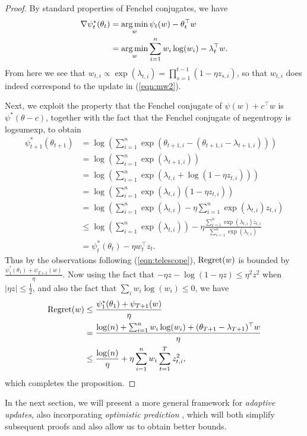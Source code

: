\documentclass[paper_icml.tex]{subfiles}
\begin{document}
\begin{proof}
By standard properties of Fenchel conjugates, we have
\begin{align}
\nabla \psi_t^*(\theta_t) &= \argmin_w \psi_t(w) - \theta_t^{\top}w \\
 &= \argmin_w \sum_{i=1}^n w_i\log(w_i) - \lambda_t^{\top}w.
\end{align}
From here we see that 
$w_{t,i} \propto \exp(\lambda_{t,i}) = \prod_{s=1}^{t-1} (1-\eta z_{s,i})$, 
so that $w_{t,i}$ does indeed correspond to the update in (\ref{eqn:mw2}). 

Next, we exploit the property that the Fenchel conjugate of $\psi(w) + c^{\top}w$ 
is $\psi^*(\theta - c)$, together with the fact that the Fenchel conjugate of 
negentropy is logsumexp, to obtain
\begin{align}
\psi_{t+1}^*(\theta_{t+1}) &= \log\left(\sum_{i=1}^n \exp(\theta_{t+1,i} - (\theta_{t+1,i}-\lambda_{t+1,i}))\right) \\
 &= \log\left(\sum_{i=1}^n \exp(\lambda_{t+1,i})\right) \\
 &= \log\left(\sum_{i=1}^n \exp(\lambda_{t,i} + \log(1 - \eta z_{t,i}))\right) \\
 &= \log\left(\sum_{i=1}^n \exp(\lambda_{t,i})(1 - \eta z_{t,i})\right) \\
 &= \log\left(\sum_{i=1}^n \exp(\lambda_{t,i}) - \eta \sum_{i=1}^n \exp(\lambda_{t,i})z_{t,i}\right) \\
 &\leq \log\left(\sum_{i=1}^n \exp(\lambda_{t,i})\right) - \eta \frac{\sum_{i=1}^n \exp(\lambda_{t,i})z_{t,i}}{\sum_{i=1}^n \exp(\lambda_{t,i})} \\
 &= \psi_t^*(\theta_t) - \eta w_t^{\top}z_t.
\end{align}
Thus by the observations following (\ref{eqn:telescope}), $\operatorname{Regret}(w)$ is bounded by 
$\frac{\psi_1^*(\theta_1) + \psi_{T+1}(w)}{\eta}$. Now using the fact that 
$-\eta z - \log(1-\eta z) \leq \eta^2 z^2$ when $|\eta z| \leq \frac{1}{2}$, and also the 
fact that $\sum_i w_i\log(w_i) \leq 0$, we have
\begin{align}
\operatorname{Regret}(w) &\leq \frac{\psi_1^*(\theta_1) + \psi_{T+1}(w)}{\eta} \\
 &= \frac{\log(n) + \sum_{i=1}^n w_i\log(w_i) + (\theta_{T+1}-\lambda_{T+1})^{\top}w}{\eta} \\
 &\leq \frac{\log(n)}{\eta} + \eta \sum_{i=1}^n w_i \sum_{t=1}^T z_{t,i}^2,
\end{align}
which completes the proposition.
\end{proof}
In the next section, we will present a more general framework for \emph{adaptive updates}, 
also incorporating \emph{optimistic prediction} \cite{rakhlin2012}, which will both simplify 
subsequent proofs and also allow us to obtain better bounds.
\end{document}
